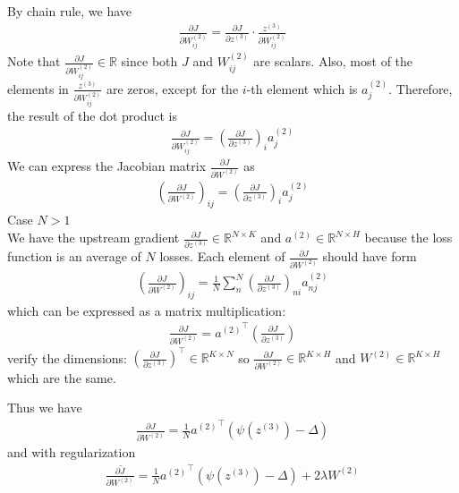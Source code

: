 \documentclass{article}
\newcommand{\ab}{a^{(2)}}
\newcommand{\zc}{z^{(3)}}
\newcommand{\Wb}{W^{(2)}}
\begin{document}
By chain rule, we have
\begin{align*}
    \frac{\partial J}{\partial \Wb_{ij}} = \frac{\partial J}{\partial \zc} \cdot \frac{\zc}{\partial \Wb_{ij}}
\end{align*}
Note that $\frac{\partial J}{\partial \Wb_{ij}} \in \mathbb{R}$ since both $J$ and $\Wb_{ij}$ are scalars.
Also, most of the elements in $\frac{\zc}{\partial \Wb_{ij}}$ are zeros, except for the $i$-th element which is $\ab_j$.
Therefore, the result of the dot product is
\begin{align*}
    \frac{\partial J}{\partial \Wb_{ij}} = (\frac{\partial J}{\partial \zc})_i \ab_j
\end{align*}
We can express the Jacobian matrix $\frac{\partial J}{\partial \Wb}$ as
\begin{align*}
    \left(\frac{\partial J}{\partial \Wb}\right)_{ij} = \left(\frac{\partial J}{\partial \zc}\right)_i \ab_j
\end{align*}
Case $N > 1$\\
We have the upstream gradient $\frac{\partial J}{\partial \zc} \in \mathbb{R}^{N\times K}$ 
and $\ab \in \mathbb{R}^{N\times H}$ because the loss function is an average of $N$ losses.
Each element of $\frac{\partial J}{\partial \Wb}$ should have form 
\begin{align*}
    \left(\frac{\partial J}{\partial \Wb}\right)_{ij} = \frac{1}{N}\sum_{n}^{N}\left(\frac{\partial J}{\partial \zc}\right)_{ni} \ab_{nj}
\end{align*}
which can be expressed as a matrix multiplication:
\begin{align*}
    \frac{\partial J}{\partial \Wb} = {\ab}^\top\left(\frac{\partial J}{\partial \zc}\right)
\end{align*}
verify the dimensions: ${\left(\frac{\partial J}{\partial \zc}\right)}^\top\in\mathbb{R}^{K\times N}$
so $\frac{\partial J}{\partial \Wb} \in \mathbb{R}^{K\times H}$ and $\Wb\in \mathbb{R}^{K\times H}$ 
which are the same.

Thus we have 
\begin{align*}
    \frac{\partial J}{\partial \Wb} = \frac{1}{N}{\ab}^\top\left(\psi(z^{(3)}) - \Delta\right)
\end{align*}
and with regularization
\begin{align*}
    \frac{\partial \tilde{J}}{\partial \Wb} = \frac{1}{N}{\ab}^\top\left(\psi(z^{(3)}) - \Delta\right) + 2\lambda \Wb
\end{align*}
\end{document}
